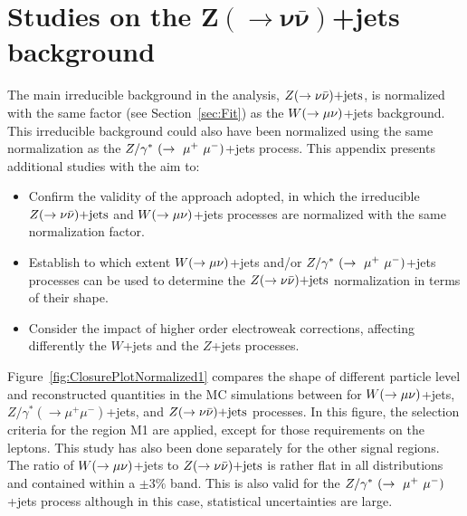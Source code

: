 \chapter{Studies on the $\mathbf{Z(\rightarrow\nu\bar{\nu})}$+jets background}
    \label{app:ClosureTestZnunu}

The main irreducible background in the analysis, $Z(\rightarrow \nu \bar{\nu})\text{+jets}$, is normalized with the same factor (see Section~\ref{sec:Fit}) as the $W(\rightarrow \mu \nu)$+jets background.
This irreducible background could also have been normalized using the same normalization as the $Z/\gamma^*~(\rightarrow~\mu^+~\mu^-)$+jets process.
This appendix presents additional studies with the aim to:

\begin{itemize}
\item Confirm the validity of the approach adopted, in which the irreducible $Z(\rightarrow \nu \bar{\nu})\text{+jets}$ and $W(\rightarrow \mu \nu)$+jets processes are normalized with the same normalization factor.

\item Establish to which extent $W(\rightarrow \mu \nu)$+jets and/or $Z/\gamma^*~(\rightarrow~\mu^+~\mu^-)$+jets processes can be used to determine the $Z(\rightarrow \nu \bar{\nu})\text{+jets}$ normalization in terms of their shape.

\item Consider the impact of higher order electroweak corrections, affecting differently the $W$+jets and the $Z$+jets processes.
\end{itemize}

Figure~\ref{fig:ClosurePlotNormalized1} compares the shape of different particle level and reconstructed quantities in the MC simulations between for $W(\rightarrow \mu \nu)$+jets, $Z/\gamma^{\ast}(\rightarrow \mu^{+}\mu^{-})$+jets, and $Z(\rightarrow \nu \bar{\nu})\text{+jets}$ processes.
In this figure, the selection criteria for the region M1 are applied, except for those requirements on the leptons.
This study has also been done separately for the other signal regions. 
The ratio of $W(\rightarrow \mu \nu)$+jets to $Z(\rightarrow \nu \bar{\nu})\text{+jets}$  is rather flat in all distributions and contained within a $\pm 3\%$ band.
This is also valid for the $Z/\gamma^*~(\rightarrow~\mu^+~\mu^-)$+jets process although in this case, statistical uncertainties are large.

%
%

